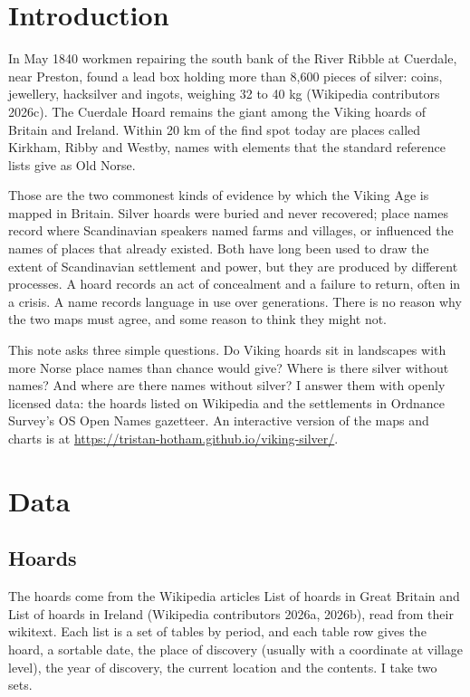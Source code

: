 \documentclass[11pt,a4paper]{article}
\begin{document}
\section{Introduction}

In May 1840 workmen repairing the south bank of the River Ribble at Cuerdale, near Preston, found a lead box holding more than 8,600 pieces of silver: coins, jewellery, hacksilver and ingots, weighing 32 to 40 kg (Wikipedia contributors 2026c). The Cuerdale Hoard remains the giant among the Viking hoards of Britain and Ireland. Within 20 km of the find spot today are places called Kirkham, Ribby and Westby, names with elements that the standard reference lists give as Old Norse.

Those are the two commonest kinds of evidence by which the Viking Age is mapped in Britain. Silver hoards were buried and never recovered; place names record where Scandinavian speakers named farms and villages, or influenced the names of places that already existed. Both have long been used to draw the extent of Scandinavian settlement and power, but they are produced by different processes. A hoard records an act of concealment and a failure to return, often in a crisis. A name records language in use over generations. There is no reason why the two maps must agree, and some reason to think they might not.

This note asks three simple questions. Do Viking hoards sit in landscapes with more Norse place names than chance would give? Where is there silver without names? And where are there names without silver? I answer them with openly licensed data: the hoards listed on Wikipedia and the settlements in Ordnance Survey's OS Open Names gazetteer. An interactive version of the maps and charts is at \url{https://tristan-hotham.github.io/viking-silver/}.

\section{Data}

\subsection{Hoards}

The hoards come from the Wikipedia articles List of hoards in Great Britain and List of hoards in Ireland (Wikipedia contributors 2026a, 2026b), read from their wikitext. Each list is a set of tables by period, and each table row gives the hoard, a sortable date, the place of discovery (usually with a coordinate at village level), the year of discovery, the current location and the contents. I take two sets.
\end{document}
